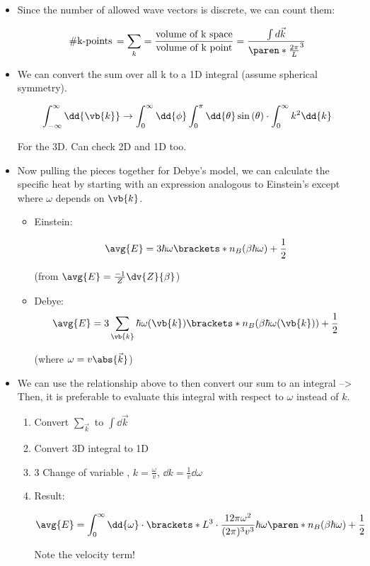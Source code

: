 \begin{itemize}
    \item Since the number of allowed wave vectors is discrete, we can count them:

        \[ \text{\#k-points} \, = \sum_k = \frac{\text{volume of k space}}{\text{volume of k point}} = \frac{\int d\vec{k}}{\paren*{\frac{2\pi}{L}}^3}\]

    \item We can convert the sum over all k to a 1D integral (assume spherical symmetry).

    \[ \int_{-\infty}^{\infty} \dd{\vb{k}} \rightarrow \int_{0}^{\infty} \dd{\phi} \int_{0}^{\pi} \dd{\theta} \sin{(\theta)} \cdot \int_{0}^{\infty} k^2 \dd{k}\]

    For the 3D. Can check 2D and 1D too.

    \item Now pulling the pieces together for Debye's model, we can calculate the specific heat by starting with an expression analogous to Einstein's except where $\omega$ depends on $\vb{k}$.

    \begin{itemize}
        \item Einstein:

        \[ \avg{E} = 3 \hbar \omega \brackets*{n_B (\beta \hbar \omega) + \frac{1}{2}}\]

        (from $\avg{E} = \frac{-1}{Z} \dv{Z}{\beta}$)
        \item Debye:
        \[ \avg{E} = 3 \sum_{\vb{k}} \hbar \omega(\vb{k})  \brackets*{n_B (\beta \hbar \omega(\vb{k})) + \frac{1}{2}}\]

        (where $\omega = v \abs{\vec{k}}$)
        
    \end{itemize}

    \item We can use the relationship above to then convert our sum to an integral --> Then, it is preferable to evaluate this integral with respect to $\omega$ instead of $k$.

    \begin{enumerate}
        \item Convert $\sum_{\vec{k}}$ to $\int 
        \dd{\vec{k}}$
        \item Convert 3D integral to 1D
        \item 3 Change of variable , $k=\frac{\omega}{v}$, $\dd{k} = \frac{1}{v} \dd{\omega}$
        \item Result: 

        \[ \avg{E} = \int_0^{\infty} \dd{\omega} \cdot \brackets*{L^3 \cdot \frac{12 \pi \omega^2}{(2 \pi)^3 v^3 }} \hbar \omega \paren*{n_B(\beta \hbar \omega) + \frac{1}{2}}\]

        Note the velocity term!
    \end{enumerate}
    
\end{itemize}



